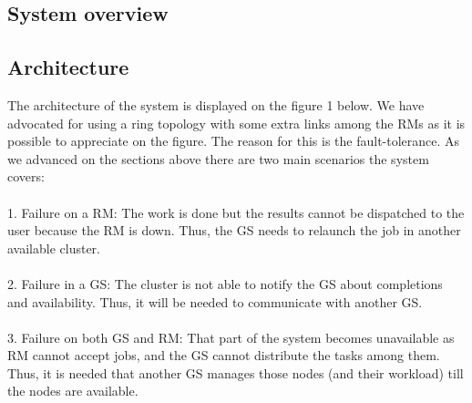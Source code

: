 \documentclass{article}
\begin{document}
\subsection{System overview}
\subsection{Architecture}
The architecture of the system is displayed on the figure 1 below. We have advocated for using a ring topology with some extra links among the RMs as it is possible to appreciate on the figure. The reason for this is the fault-tolerance. As we advanced on the sections above there are two main scenarios the system covers:
\\\\
1. Failure on a RM: The work is done but the results cannot be dispatched to the user because the RM is down. Thus, the GS needs to relaunch the job in another available cluster.
\\\\
2. Failure in a GS: The cluster is not able to notify the GS about completions and availability. Thus, it will be needed to communicate with another GS.
\\\\
3. Failure on both GS and RM: That part of the system becomes unavailable as RM cannot accept jobs, and the GS cannot distribute the tasks among them. Thus, it is needed that another GS manages those nodes (and their workload) till the nodes are available.
\\\\
\end{document}
